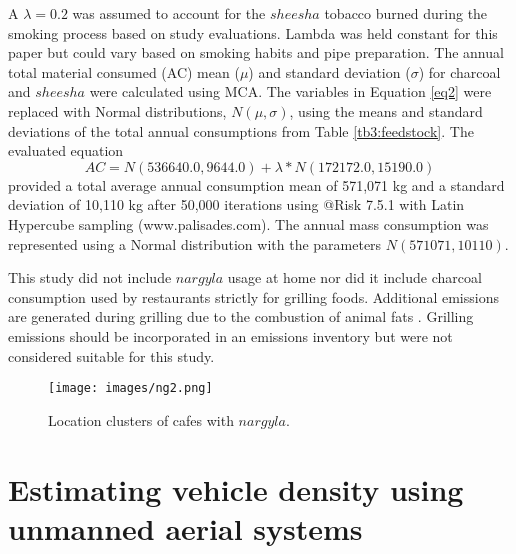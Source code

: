 A $\lambda = 0.2$ was assumed to account for the $sheesha$ tobacco burned during the smoking process based on study evaluations.  Lambda was held constant for this paper but could vary based on smoking habits and pipe preparation.  The annual total material consumed (AC) mean ($\mu$) and standard deviation ($\sigma$) for charcoal and $sheesha$ were calculated using MCA.  The variables in Equation \ref{eq2} were replaced with Normal distributions, $N(\mu,\sigma)$,  using the means and standard deviations of the total annual consumptions from Table \ref{tb3:feedstock}.  The evaluated equation            
%
\begin{equation}
\label{eq7}
AC = N(536640.0,  9644.0) + \lambda*N(172172.0, 15190.0)
\end{equation}
%
\noindent
provided a total average annual consumption mean of 571,071 kg and a standard deviation of 10,110 kg after 50,000 iterations using @Risk 7.5.1 with Latin Hypercube sampling (www.palisades.com).  The annual mass consumption was represented using a Normal distribution with the parameters $N(571071, 10110)$.

This study did not include $nargyla$ usage at home nor did it include charcoal consumption used by restaurants strictly for grilling foods.  Additional emissions are generated during grilling due to the combustion of animal fats \citep{McDonald2003}.  Grilling emissions should be incorporated in an emissions inventory but were not considered suitable for this study.

%
\begin{figure}[H]
\texttt{[image: images/ng2.png]} 
\caption{Location clusters of cafes with $nargyla$.}
\label{figng2:cafes}
\end{figure}
%
\clearpage
\section{Estimating vehicle density using unmanned aerial systems}


